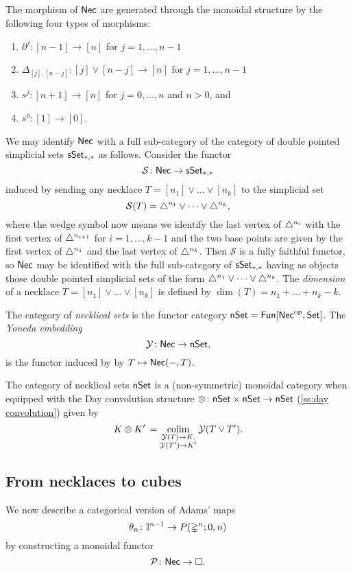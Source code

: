 The morphism of $\mathsf{Nec}$ are generated through the monoidal structure by the following four types of morphisms:
\begin{enumerate}
	\item $\partial^j \colon [n-1] \to [n]$ for $j = 1, \dots, n-1$
	\item $\Delta_{[j], [n-j]} \colon [j] \vee [n-j] \to [n]$ for $j = 1, \dots, n-1$
	\item $s^j \colon [n+1] \to [n]$ for $j = 0, \dots, n$ and $n>0$, and
	\item $s^0 \colon [1] \to [0]$.
\end{enumerate}
We may identify $\mathsf{Nec}$ with a full sub-category of the category of double pointed simplicial sets $\mathsf{sSet}_{*,*}$ as follows.
Consider the functor
\[
\mathcal{S} \colon \mathsf{Nec} \to \mathsf{sSet}_{*,*}
\]
 induced by sending any necklace $T = [n_1] \vee \dots \vee[n_k]$ to the simplicial set
\[
\mathcal{S}(T) = \triangle^{n_1} \vee \dots \vee \triangle^{n_k},
\]
where the wedge symbol now means we identify the last vertex of $\triangle^{n_i}$ with the first vertex of $\triangle^{n_{i+1}}$ for $i = 1, \dots, k-1$ and the two base points are given by the first vertex of $\triangle^{n_1}$ and the last vertex of $\triangle^{n_k}$.
Then $\mathcal{S}$ is a fully faithful functor, so $\mathsf{Nec}$ may be identified with the full sub-category of $\mathsf{sSet}_{*,*}$ having as objects those double pointed simplicial sets of the form $\triangle^{n_1} \vee \dots \vee \triangle^{n_k}$.
The \textit{dimension} of a necklace $T = [n_1] \vee \dots \vee[n_k]$ is defined by $\dim(T) = n_1 + \dots + n_k-k$.

The category of \textit{necklical sets} is the functor category $\mathsf{nSet} = \mathsf{Fun}[\mathsf{Nec}^{\mathrm{op}}, \mathsf{Set}]$.
The \textit{Yoneda embedding}
\[
\mathcal{Y} \colon \mathsf{Nec} \to \mathsf{nSet},
\]
is the functor induced by by $T \mapsto \mathsf{Nec}(-,T)$.

The category of necklical sets $\mathsf{nSet}$ is a (non-symmetric) monoidal category when equipped with the Day convolution structure $\otimes \colon \mathsf{nSet} \times \mathsf{nSet} \to \mathsf{nSet}$ (\cref{ss:day convolution}) given by
\[
K \otimes K' \, = \operatorname*{colim}_{\substack{\mathcal{Y}(T) \to K, \\ \mathcal{Y}(T')\to K'}} \mathcal{Y}(T \vee T').
\]

\subsection{From necklaces to cubes}

We now describe a categorical version of Adams' maps
\[
\theta_n \colon \mathbb{I}^{n-1} \to P(\mathbb{\Delta}^{n};0,n)
\]
by constructing a monoidal functor
\[
\mathcal{P} \colon \mathsf{Nec} \to \square.
\]

